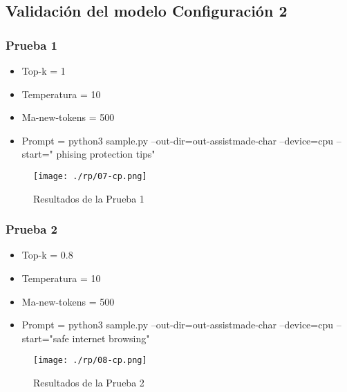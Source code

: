 \subsection{Validación del modelo Configuración 2}\label{section:Validación Modelo 2}
\subsubsection{ Prueba 1}\label{section:Prueba 1 config 2}
    \begin{itemize}
        \item   Top-k = 1
        \item   Temperatura = 10
        \item   Ma-new-tokens = 500
        \item    Prompt = python3 sample.py --out-dir=out-assistmade-char --device=cpu --start=" phising protection tips"
    \end{itemize}
\begin{figure}[H]
   \centering %
       \texttt{[image: ./rp/07-cp.png]} 
   \caption{Resultados de la Prueba 1\cite{}}
  \label{figure:Result prueba 1 mol 2}  %
\end{figure}
\subsubsection{ Prueba 2}\label{section:Prueba2}
    \begin{itemize}
        \item   Top-k = 0.8
        \item   Temperatura = 10
        \item   Ma-new-tokens = 500
        \item   Prompt = python3 sample.py --out-dir=out-assistmade-char --device=cpu --start="safe internet browsing"
    \end{itemize}
\begin{figure}[H]
   \centering %
       \texttt{[image: ./rp/08-cp.png]} 
   \caption{Resultados de la Prueba 2\cite{}}
  \label{figure:Result prueb 2 mol 2}  %
\end{figure}
